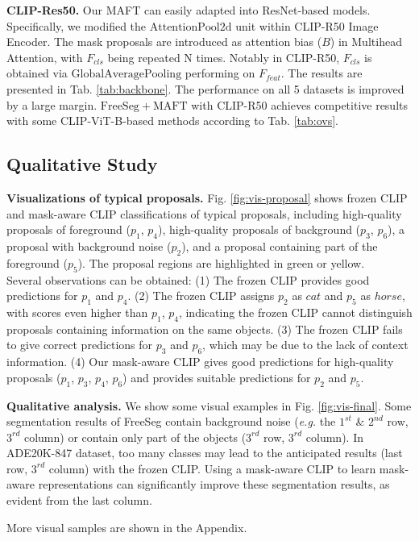 \noindent \textbf{CLIP-Res50.}
Our MAFT can easily adapted into ResNet-based models. Specifically, we modified the $\mathrm{AttentionPool2d}$ unit within CLIP-R50 Image Encoder. The mask proposals are introduced as attention bias ($B$) in Multihead Attention, with $F_{cls}$ being repeated N times. Notably in CLIP-R50, $F_{cls}$ is obtained via $\mathrm{GlobalAveragePooling}$ performing on $F_{feat}$. The results are presented in Tab. \ref{tab:backbone}. The performance on all 5 datasets is improved by a large margin. $\mathrm{FreeSeg+MAFT}$ with CLIP-R50 achieves competitive results with some CLIP-ViT-B-based methods according to Tab. \ref{tab:ovs}.

\subsection{Qualitative Study}

\noindent \textbf{Visualizations of typical proposals.}
Fig. \ref{fig:vis-proposal} shows frozen CLIP and mask-aware CLIP classifications of typical proposals, 
including high-quality proposals of foreground ($p_1$, $p_4$), high-quality proposals of background ($p_3$, $p_6$), a proposal with background noise ($p_2$), and a proposal containing part of the foreground ($p_5$). The proposal regions are highlighted in green or yellow. \\
Several observations can be obtained: (1) The frozen CLIP provides good predictions for $p_1$ and $p_4$. (2) The frozen CLIP assigns $p_2$ as $cat$ and $p_5$ as $horse$, with scores even higher than $p_1$, $p_4$, indicating the frozen CLIP cannot distinguish proposals containing information on the same objects. (3) The frozen CLIP fails to give correct predictions for $p_3$ and $p_6$, which may be due to the lack of context information. (4) Our mask-aware CLIP gives good predictions for high-quality proposals ($p_1$, $p_3$, $p_4$, $p_6$) and provides suitable predictions for $p_2$ and $p_5$.


\noindent \textbf{Qualitative analysis.}
We show some visual examples in Fig. \ref{fig:vis-final}. Some segmentation results of FreeSeg contain background noise (\textit{e.g.} the $1^{st}$ \& $2^{nd}$ row, $3^{rd}$ column) or contain only part of the objects ($3^{rd}$ row, $3^{rd}$ column). In ADE20K-847 dataset, too many classes may lead to the anticipated results (last row, $3^{rd}$ column) with the frozen CLIP.
Using a mask-aware CLIP to learn mask-aware representations can significantly improve these segmentation results, as evident from the last column.

More visual samples are shown in the Appendix.
